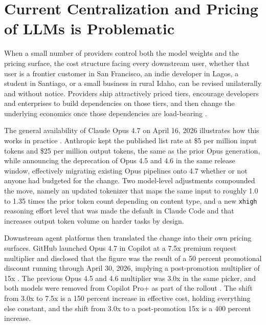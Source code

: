 \documentclass[10pt,a4paper,twocolumn]{article}
\begin{document}
\section{Current Centralization and Pricing of LLMs is Problematic}
\label{sec:pricing}

When a small number of providers control both the model weights and the pricing surface, the cost structure facing every downstream user, whether that user is a frontier customer in San Francisco, an indie developer in Lagos, a student in Santiago, or a small business in rural Idaho, can be revised unilaterally and without notice. Providers ship attractively priced tiers, encourage developers and enterprises to build dependencies on those tiers, and then change the underlying economics once those dependencies are load-bearing \citep{zeff2025anthropic}.

The general availability of Claude Opus 4.7 on April 16, 2026 illustrates how this works in practice \citep{anthropic2026opus47}. Anthropic kept the published list rate at \$5 per million input tokens and \$25 per million output tokens, the same as the prior Opus generation, while announcing the deprecation of Opus 4.5 and 4.6 in the same release window, effectively migrating existing Opus pipelines onto 4.7 whether or not anyone had budgeted for the change. Two model-level adjustments compounded the move, namely an updated tokenizer that maps the same input to roughly 1.0 to 1.35 times the prior token count depending on content type, and a new \texttt{xhigh} reasoning effort level that was made the default in Claude Code and that increases output token volume on harder tasks by design.

Downstream agent platforms then translated the change into their own pricing surfaces. GitHub launched Opus 4.7 in Copilot at a 7.5x premium request multiplier and disclosed that the figure was the result of a 50 percent promotional discount running through April 30, 2026, implying a post-promotion multiplier of 15x \citep{github2026opus47}. The previous Opus 4.5 and 4.6 multiplier was 3.0x in the same picker, and both models were removed from Copilot Pro+ as part of the rollout \citep{vscode2026opus47issue}. The shift from 3.0x to 7.5x is a 150 percent increase in effective cost, holding everything else constant, and the shift from 3.0x to a post-promotion 15x is a 400 percent increase.
\end{document}
